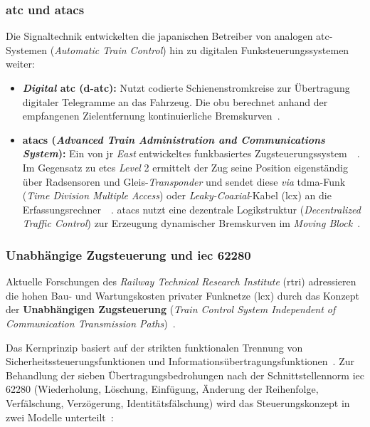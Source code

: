 \documentclass[runningheads]{res/llncs}
\begin{document}
\subsubsection{\texorpdfstring{\gls{atc} und \gls{atacs}}{ATC und ATACS}}
\label{sec:ATC_und_ATACS}
Die Signaltechnik entwickelten die japanischen Betreiber von analogen \gls{atc}-Systemen (\textit{Automatic Train Control}) hin zu digitalen Funksteuerungssystemen weiter:

\begin{itemize}
    \item \textbf{\textit{Digital} \gls{atc} (\gls{d-atc}):} Nutzt codierte Schienenstromkreise zur Übertragung digitaler Telegramme an das Fahrzeug. Die \gls{obu} berechnet anhand der empfangenen Zielentfernung kontinuierliche Bremskurven~\parencite[S. 44--45]{h.tsukisawaStandardization2024}.
    \item \textbf{\gls{atacs} (\textit{Advanced Train Administration and Communications System}):} Ein von \gls{jr} \textit{East} entwickeltes funkbasiertes Zugsteuerungssystem~\parencite[S. 13--14]{xiangliuCyber2020}~\parencite[S. 45]{h.tsukisawaStandardization2024}. Im Gegensatz zu \gls{etcs} \textit{Level} 2 ermittelt der Zug seine Position eigenständig über Radsensoren und Gleis-\textit{Transponder} und sendet diese \textit{via} \gls{tdma}-Funk (\textit{Time Division Multiple Access}) oder \textit{Leaky-Coaxial}-Kabel (\gls{lcx}) an die Erfassungsrechner~\parencite[S. 6, 8]{iwamotoTrain2024}~\parencite[S. 14]{xiangliuCyber2020}. \gls{atacs} nutzt eine dezentrale Logikstruktur (\textit{Decentralized Traffic Control}) zur Erzeugung dynamischer Bremskurven im \textit{Moving Block}~\parencite[S. 14]{xiangliuCyber2020}.
\end{itemize}

\subsubsection{\texorpdfstring{Unabhängige Zugsteuerung und \gls{iec} 62280}{Unabhängige Zugsteuerung und IEC 62280}}
\label{sec:Unabhängige_Zugsteuerung_und_IEC_62280}
Aktuelle Forschungen des \textit{Railway Technical Research Institute} (\gls{rtri}) adressieren die hohen Bau- und Wartungskosten privater Funknetze (\gls{lcx}) durch das Konzept der \textbf{Unabhängigen Zugsteuerung} (\textit{Train Control System Independent of Communication Transmission Paths})~\parencite[S. 1--3]{iwamotoTrain2024}. 

Das Kernprinzip basiert auf der strikten funktionalen Trennung von Sicherheitssteuerungsfunktionen und Informationsübertragungsfunktionen~\parencite[S. 1, 4]{iwamotoTrain2024}. Zur Behandlung der sieben Übertragungsbedrohungen nach der Schnittstellennorm \gls{iec} 62280 (Wiederholung, Löschung, Einfügung, Änderung der Reihenfolge, Verfälschung, Verzögerung, Identitätsfälschung) wird das Steuerungskonzept in zwei Modelle unterteilt~\parencite[S. 7, 10--11]{iwamotoTrain2024}:
\end{document}
